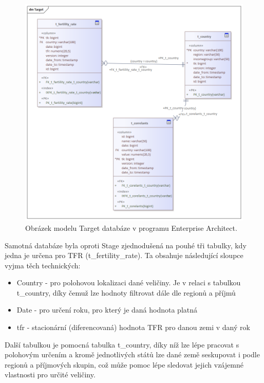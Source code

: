 \documentclass[thesis=M,czech]{FITthesis}[2022/10/08]
\begin{document}
\begin{figure}
    \centering
    \includegraphics[width=\textwidth]{DP-obrazky/Target.png}
    \caption{Obrázek modelu Target databáze v programu Enterprise Architect.}
    \label{fig:Target_model}
\end{figure}

Samotná databáze byla oproti Stage zjednodušená na pouhé tři tabulky, kdy jedna je určena pro TFR (t\_fertility\_rate). Ta obsahuje následující sloupce vyjma těch technických:

\begin{itemize}
    \item Country - pro polohovou lokalizaci dané veličiny. Je v relaci s tabulkou t\_country, díky čemuž lze hodnoty filtrovat dále dle regionů a příjmů
    \item Date - pro určení roku, pro který je daná hodnota platná
    \item tfr - stacionární (diferencovaná) hodnota TFR pro danou zemi v daný rok
\end{itemize}


Další tabulkou je pomocná tabulka t\_country, díky níž lze lépe pracovat s polohovým určením a kromě jednotlivých států lze dané země seskupovat i podle regionů a příjmových skupin, což může pomoc lépe sledovat jejich vzájemné vlastnosti pro určité veličiny.
\end{document}
